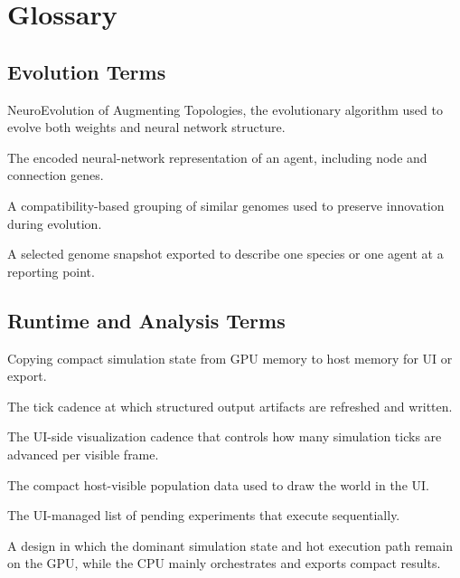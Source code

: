 \section{Glossary}
\label{sec:glossary}

\subsection{Evolution Terms}

\begin{description}[style=nextline,leftmargin=4.2cm,font=\normalfont\bfseries]
  \item[NEAT] NeuroEvolution of Augmenting Topologies, the evolutionary algorithm used to evolve
  both weights and neural network structure.

  \item[Genome] The encoded neural-network representation of an agent, including node and
  connection genes.

  \item[Species] A compatibility-based grouping of similar genomes used to preserve innovation
  during evolution.

  \item[Representative genome] A selected genome snapshot exported to describe one species or one
  agent at a reporting point.
\end{description}

\subsection{Runtime and Analysis Terms}

\begin{description}[style=nextline,leftmargin=4.2cm,font=\normalfont\bfseries]
  \item[Readback] Copying compact simulation state from GPU memory to host memory for UI or
  export.

  \item[Report interval] The tick cadence at which structured output artifacts are refreshed and
  written.

  \item[Speed multiplier] The UI-side visualization cadence that controls how many simulation
  ticks are advanced per visible frame.

  \item[Render snapshot] The compact host-visible population data used to draw the world in the
  UI.

  \item[Run queue] The UI-managed list of pending experiments that execute sequentially.

  \item[GPU-first architecture] A design in which the dominant simulation state and hot
  execution path remain on the GPU, while the CPU mainly orchestrates and exports compact
  results.
\end{description}
